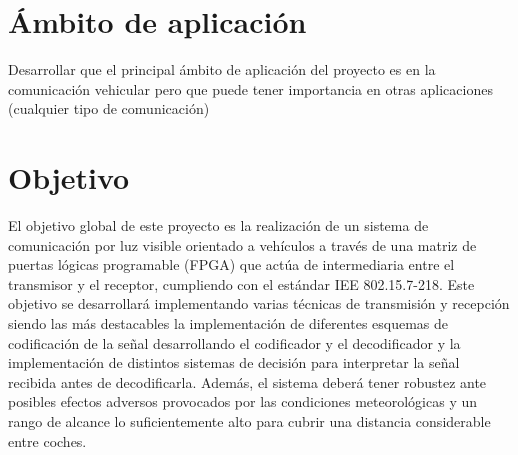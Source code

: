 \section{Ámbito de aplicación}

Desarrollar que el principal ámbito de aplicación del proyecto es en la comunicación vehicular pero que puede tener importancia en otras aplicaciones (cualquier tipo de comunicación)

\section{Objetivo}
\label{sec:intro:obj}
El objetivo global de este proyecto es la realización de un sistema de comunicación por luz
visible orientado a vehículos a través de una matriz de puertas lógicas programable
(FPGA) que actúa de intermediaria entre el transmisor y el receptor, cumpliendo con el
estándar IEE 802.15.7-218.
Este objetivo se desarrollará implementando varias técnicas de transmisión y recepción siendo las más destacables la implementación de 
diferentes esquemas de codificación de la señal desarrollando el codificador y el decodificador y la implementación de distintos sistemas de 
decisión para interpretar la señal recibida antes de decodificarla. 
Además, el sistema deberá tener robustez ante posibles
efectos adversos provocados por las condiciones meteorológicas y un rango de
alcance lo suficientemente alto para cubrir una distancia considerable entre coches.

\chapterend
